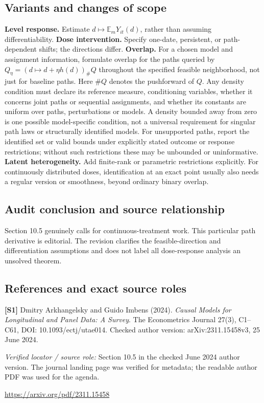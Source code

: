 \documentclass[11pt,a4paper]{article}
\begin{document}
\subsection*{Variants and changes of scope}

\textbf{Level response.} Estimate $d\mapsto\mathbb E_mY_{it}(d)$, rather than assuming differentiability. \textbf{Dose intervention.} Specify one-date, persistent, or path-dependent shifts; the directions differ. \textbf{Overlap.} For a chosen model and assignment information, formulate overlap for the paths queried by $Q_\eta=(d\mapsto d+\eta h(d))_\#Q$ throughout the specified feasible neighborhood, not just for baseline paths. Here $\#Q$ denotes the pushforward of $Q$. Any density condition must declare its reference measure, conditioning variables, whether it concerns joint paths or sequential assignments, and whether its constants are uniform over paths, perturbations or models. A density bounded away from zero is one possible model-specific condition, not a universal requirement for singular path laws or structurally identified models. For unsupported paths, report the identified set or valid bounds under explicitly stated outcome or response restrictions; without such restrictions these may be unbounded or uninformative. \textbf{Latent heterogeneity.} Add finite-rank or parametric restrictions explicitly. For continuously distributed doses, identification at an exact point usually also needs a regular version or smoothness, beyond ordinary binary overlap.

\subsection*{Audit conclusion and source relationship}

Section 10.5 genuinely calls for continuous-treatment work. This particular path derivative is editorial. The revision clarifies the feasible-direction and differentiation assumptions and does not label all dose-response analysis an unsolved theorem.

\subsection*{References and exact source roles}

{\footnotesize\raggedright
\par\noindent\textbf{[S1]} Dmitry Arkhangelsky and Guido Imbens (2024). \emph{Causal Models for Longitudinal and Panel Data: A Survey}. The Econometrics Journal 27(3), C1--C61, DOI: 10.1093/ectj/utae014. Checked author version: arXiv:2311.15458v3, 25 June 2024.\par \textit{Verified locator / source role:} Section 10.5 in the checked June 2024 author version. The journal landing page was verified for metadata; the readable author PDF was used for the agenda.\par \url{https://arxiv.org/pdf/2311.15458}\par\smallskip
}
\end{document}
